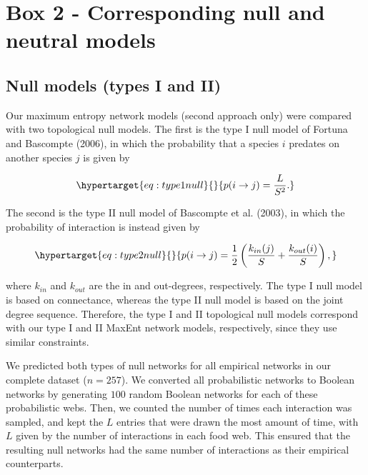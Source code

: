\documentclass[10pt,oneside]{article}
\begin{document}
\hypertarget{box-2---corresponding-null-and-neutral-models}{%
\section{Box 2 - Corresponding null and neutral
models}\label{box-2---corresponding-null-and-neutral-models}}

\hypertarget{null-models-types-i-and-ii}{%
\subsection{Null models (types I and
II)}\label{null-models-types-i-and-ii}}

Our maximum entropy network models (second approach only) were compared
with two topological null models. The first is the type I null model of
Fortuna and Bascompte (2006), in which the probability that a species
\(i\) predates on another species \(j\) is given by

\begin{equation}\protect\hypertarget{eq:type1null}{}{p(i \rightarrow j) = \frac{L}{S^2}.}\label{eq:type1null}\end{equation}

The second is the type II null model of Bascompte et al. (2003), in
which the probability of interaction is instead given by

\begin{equation}\protect\hypertarget{eq:type2null}{}{p(i \rightarrow j) = \frac{1}{2} \left(\frac{k_{in}(j)}{S} + \frac{k_{out}(i)}{S}\right),}\label{eq:type2null}\end{equation}

where \(k_{in}\) and \(k_{out}\) are the in and out-degrees,
respectively. The type I null model is based on connectance, whereas the
type II null model is based on the joint degree sequence. Therefore, the
type I and II topological null models correspond with our type I and II
MaxEnt network models, respectively, since they use similar constraints.

We predicted both types of null networks for all empirical networks in
our complete dataset (\(n = 257\)). We converted all probabilistic
networks to Boolean networks by generating \(100\) random Boolean
networks for each of these probabilistic webs. Then, we counted the
number of times each interaction was sampled, and kept the \(L\) entries
that were drawn the most amount of time, with \(L\) given by the number
of interactions in each food web. This ensured that the resulting null
networks had the same number of interactions as their empirical
counterparts.
\end{document}
